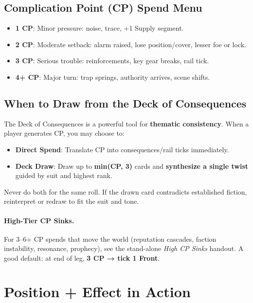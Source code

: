 \subsection*{Complication Point (CP) Spend Menu}

\begin{itemize}
    \item \textbf{1 CP}: Minor pressure: noise, trace, +1 Supply segment.
    \item \textbf{2 CP}: Moderate setback: alarm raised, lose position/cover, lesser foe or lock.
    \item \textbf{3 CP}: Serious trouble: reinforcements, key gear breaks, rail tick.
    \item \textbf{4+ CP}: Major turn: trap springs, authority arrives, scene shifts.
\end{itemize}

\subsection*{When to Draw from the Deck of Consequences}

The Deck of Consequences is a powerful tool for \textbf{thematic consistency}. When a player generates CP, you may choose to:

\begin{itemize}
    \item \textbf{Direct Spend}: Translate CP into consequences/rail ticks immediately.
    \item \textbf{Deck Draw}: Draw up to \textbf{min(CP, 3)} cards and \textbf{synthesize a single twist} guided by suit and highest rank.
\end{itemize}

Never do both for the same roll. If the drawn card contradicts established fiction, reinterpret or redraw to fit the suit and tone.

\paragraph{High-Tier CP Sinks.}
For 3--6+ CP spends that move the world (reputation cascades, faction instability, resonance, prophecy), see the stand-alone \emph{High CP Sinks} handout. A good default: at end of leg, \textbf{3 CP → tick 1 Front}.

\section*{Position + Effect in Action}

